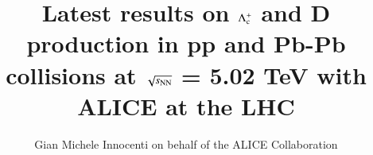 \documentclass[3p,times,procedia]{elsarticle}
\newcommand{\sqrtsNN}{\sqrt{s_{\rm NN}}}
\newcommand{\Lc}{{\rm \Lambda_{c}^+}}
\begin{document}
\begin{frontmatter}




\title{Latest results on $\Lc$ and D production in pp and Pb-Pb collisions at $\sqrtsNN$ = 5.02 TeV with ALICE at the LHC}


\author{Gian Michele Innocenti on behalf of the ALICE Collaboration}

\address{CERN, Espl. des Particules 1, 1211 Meyrin, Switzerland}


\end{frontmatter}
\end{document}

